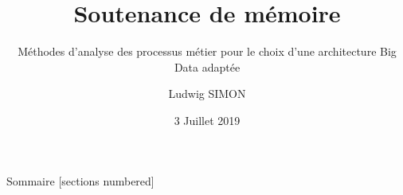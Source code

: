 \documentclass[10pt]{beamer}
\title{Soutenance de mémoire}
\subtitle{Méthodes d'analyse des processus métier pour le choix d'une architecture Big Data adaptée}
\date{3 Juillet 2019}
\author{Ludwig SIMON}
\institute{Université Paris Nanterre\\Tuteur : Mcf. Emanuel HYON}
\begin{document}
\maketitle

\begin{frame}{Sommaire}
  [sections numbered]
  \tableofcontents[hideallsubsections]
\end{frame}










\end{document}

